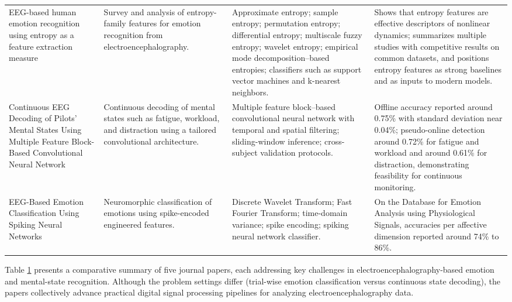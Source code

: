 \documentclass[conference]{IEEEtran}
\begin{document}
\begin{table}[htbp]
{\begin{tabular}{p{3cm} p{2.5cm} p{5cm} p{4cm}}
        EEG-based human emotion recognition using entropy as a feature extraction measure \cite{Patel2021EEGEntropyReview}
        & Survey and analysis of entropy-family features for emotion recognition from electroencephalography.
        & Approximate entropy; sample entropy; permutation entropy; differential entropy; multiscale fuzzy entropy; wavelet entropy; empirical mode decomposition–based entropies; classifiers such as support vector machines and k-nearest neighbors.
        & Shows that entropy features are effective descriptors of nonlinear dynamics; summarizes multiple studies with competitive results on common datasets, and positions entropy features as strong baselines and as inputs to modern models. \\
        
        Continuous EEG Decoding of Pilots’ Mental States Using Multiple Feature Block-Based Convolutional Neural Network \cite{Lee2020MFB_CNN_PilotMentalStates}
        & Continuous decoding of mental states such as fatigue, workload, and distraction using a tailored convolutional architecture.
        & Multiple feature block–based convolutional neural network with temporal and spatial filtering; sliding-window inference; cross-subject validation protocols.
        & Offline accuracy reported around 0.75\% with standard deviation near 0.04\%; pseudo-online detection around 0.72\% for fatigue and workload and around 0.61\% for distraction, demonstrating feasibility for continuous monitoring. \\
        
        EEG-Based Emotion Classification Using Spiking Neural Networks \cite{Luo2020SNN_EEGEmotion}
        & Neuromorphic classification of emotions using spike-encoded engineered features.
        & Discrete Wavelet Transform; Fast Fourier Transform; time-domain variance; spike encoding; spiking neural network classifier.
        & On the Database for Emotion Analysis using Physiological Signals, accuracies per affective dimension reported around 74\% to 86\%. \\
        \hline
    \end{tabular}
    }
    \label{tab:summary_journal}
\end{table}

\FloatBarrier 

Table \ref{tab:summary_journal} presents a comparative summary of five journal papers, each addressing key challenges in electroencephalography-based emotion and mental-state recognition. Although the problem settings differ (trial-wise emotion classification versus continuous state decoding), the papers collectively advance practical digital signal processing pipelines for analyzing electroencephalography data.
\end{document}
